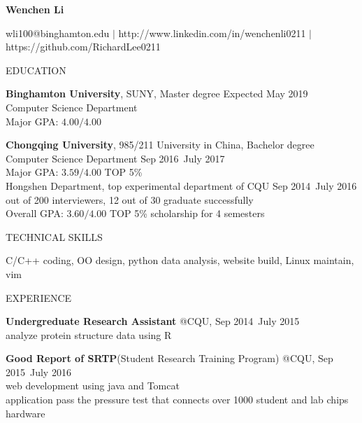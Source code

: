 \documentclass{article}
\begin{document}
\begin{center}
\large{\textbf{Wenchen Li} \par}
\end{center}

\noindent
\href{https://github.com/RichardLee0211}
{\FA \faEnvelope} wli100@binghamton.edu $|$
\href{http://www.linkedin.com/in/wenchenli0211}
{\FA \faLinkedin} http://www.linkedin.com/in/wenchenli0211 $|$
\href{https://github.com/RichardLee0211}
{\FA \faGithub} https://github.com/RichardLee0211



\vskip 0.1in
\noindent
EDUCATION
\hrulefill

\noindent
\textbf{Binghamton University}, SUNY, Master degree
\dotfill Expected May 2019 \\
Computer Science Department \\
    \indent Major GPA: $4.00/4.00$

\noindent
\textbf{Chongqing University}, 985/211 University in China, Bachelor degree \\
Computer Science Department
\dotfill Sep 2016~July 2017 \\
    \indent Major GPA: $3.59/4.00$ \textbar TOP 5\%  \\
Hongshen Department, top experimental department of CQU
\dotfill Sep 2014~July 2016 \\
     out of 200 interviewers, 12 out of 30 graduate successfully \\
    \indent Overall GPA: $3.60/4.00$ \textbar  TOP 5\% \textbar  scholarship for 4 semesters


\vskip 0.1in
\noindent
TECHNICAL SKILLS
\hrulefill

C/C++ coding,
OO design,
python data analysis,
website build,
Linux maintain,
vim

\vskip 0.1in
\noindent
EXPERIENCE
\hrulefill

\noindent
\textbf{Undergreduate Research Assistant}
\dotfill @CQU, Sep 2014~July 2015 \\
    \indent analyze protein structure data using R

\noindent
\textbf{Good Report of SRTP}(Student Research Training Program)
\dotfill @CQU, Sep 2015~July 2016 \\
    \indent web development using java and Tomcat \\
    \indent application pass the pressure test that connects over 1000 student and lab chips hardware
\end{document}
